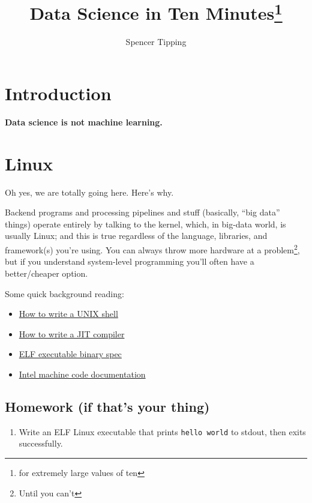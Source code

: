 \documentclass{article}
\title{Data Science in Ten Minutes\footnote{for extremely large values of ten}}
\author{Spencer Tipping}
\newcommand{\lnk}[2]{\href{#1}{\textcolor[rgb]{1.0,0.0,0.0}{#2}}}
\begin{document}
  \maketitle
  \tableofcontents

  \section{Introduction}
  {\bf Data science is not machine learning.}

  \newpage
  \section{Linux}
  Oh yes, we are totally going here. Here's why.

  Backend programs and processing pipelines and stuff (basically, ``big data''
  things) operate entirely by talking to the kernel, which, in big-data world,
  is usually Linux; and this is true regardless of the language, libraries, and
  framework(s) you're using. You can always throw more hardware at a
  problem\footnote{Until you can't}, but if you understand system-level
  programming you'll often have a better/cheaper option.

  Some quick background reading:

  \begin{itemize}
    \item \lnk{https://github.com/spencertipping/shell-tutorial}
              {How to write a UNIX shell}
    \item \lnk{https://github.com/spencertipping/jit-tutorial}
              {How to write a JIT compiler}
    \item \lnk{http://manpages.ubuntu.com/manpages/xenial/man5/elf.5.html}
              {ELF executable binary spec}
    \item \lnk{https://www.intel.com/content/dam/www/public/us/en/documents/manuals/64-ia-32-architectures-software-developer-instruction-set-reference-manual-325383.pdf}
              {Intel machine code documentation}
  \end{itemize}

  \subsection{Homework (if that's your thing)}
  \begin{enumerate}
    \item Write an ELF Linux executable that prints {\tt hello world} to stdout,
          then exits successfully.
  \end{enumerate}
\end{document}
